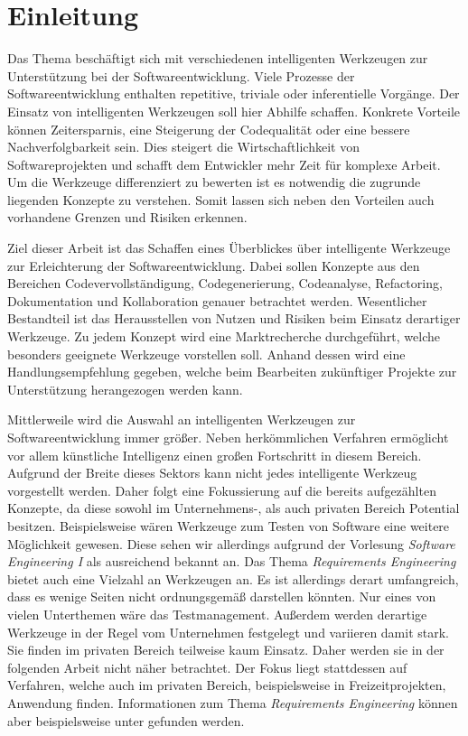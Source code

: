 \section{Einleitung}
\label{sec:einleitung}
Das Thema beschäftigt sich mit verschiedenen intelligenten Werkzeugen zur Unterstützung bei der Softwareentwicklung. Viele Prozesse der Softwareentwicklung enthalten repetitive, triviale oder inferentielle Vorgänge. Der Einsatz von intelligenten Werkzeugen soll hier Abhilfe schaffen. Konkrete Vorteile können Zeitersparnis, eine Steigerung der Codequalität oder eine bessere Nachverfolgbarkeit sein. Dies steigert die Wirtschaftlichkeit von Softwareprojekten und schafft dem Entwickler mehr Zeit für komplexe Arbeit. Um die Werkzeuge differenziert zu bewerten ist es notwendig die zugrunde liegenden Konzepte zu verstehen. Somit lassen sich neben den Vorteilen auch vorhandene Grenzen und Risiken erkennen.

Ziel dieser Arbeit ist das Schaffen eines Überblickes über intelligente Werkzeuge zur Erleichterung der Softwareentwicklung. Dabei sollen Konzepte aus den Bereichen Codevervollständigung, Codegenerierung, Codeanalyse, Refactoring, Dokumentation und Kollaboration genauer betrachtet werden. Wesentlicher Bestandteil ist das Herausstellen von Nutzen und Risiken beim Einsatz derartiger Werkzeuge. Zu jedem Konzept wird eine Marktrecherche durchgeführt, welche besonders geeignete Werkzeuge vorstellen soll. Anhand dessen wird eine Handlungsempfehlung gegeben, welche beim Bearbeiten zukünftiger Projekte zur Unterstützung herangezogen werden kann.

Mittlerweile wird die Auswahl an intelligenten Werkzeugen zur Softwareentwicklung immer größer. Neben herkömmlichen Verfahren ermöglicht vor allem künstliche Intelligenz einen großen Fortschritt in diesem Bereich. Aufgrund der Breite dieses Sektors kann nicht jedes intelligente Werkzeug vorgestellt werden. Daher folgt eine Fokussierung auf die bereits aufgezählten Konzepte, da diese sowohl im Unternehmens-, als auch privaten Bereich Potential besitzen. Beispielsweise wären Werkzeuge zum Testen von Software eine weitere Möglichkeit gewesen. Diese sehen wir allerdings aufgrund der Vorlesung \textit{Software Engineering I} als ausreichend bekannt an. Das Thema \textit{Requirements Engineering} bietet auch eine Vielzahl an Werkzeugen an. Es ist allerdings derart umfangreich, dass es wenige Seiten nicht ordnungsgemäß darstellen könnten. Nur eines von vielen Unterthemen wäre das Testmanagement. Außerdem werden derartige Werkzeuge in der Regel vom Unternehmen festgelegt und variieren damit stark. Sie finden im privaten Bereich teilweise kaum Einsatz. Daher werden sie in der folgenden Arbeit nicht näher betrachtet. Der Fokus liegt stattdessen auf Verfahren, welche auch im privaten Bereich, beispielsweise in Freizeitprojekten, Anwendung finden. Informationen zum Thema \textit{Requirements Engineering} können aber beispielsweise unter \cite{chemuturi2013} gefunden werden.